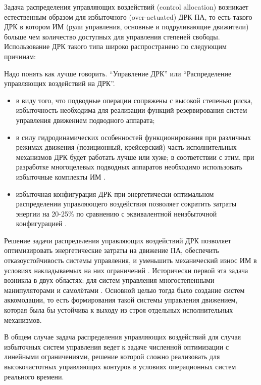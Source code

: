 {\actuality}
Задача распределения управляющих воздействий (control allocation) возникает естественным образом для избыточного (over-actuated) ДРК ПА, то есть такого ДРК в котором ИМ (рули управления, основные и подруливающие движители) больше чем количество доступных для управления степеней свободы. Использование ДРК такого типа широко распространено по следующим причинам:

\begin{notequestion}
    Надо понять как лучше говорить. ``Управление ДРК'' или ``Распределение управляющих воздействий на ДРК''.
\end{notequestion}

\begin{itemize}
    \item в виду того, что подводные операции сопряжены с высокой степенью риска, избыточность необходима для реализации функций резервирования систем управления движением подводного аппарата;
    \item в силу гидродинамических особенностей функционирования при различных режимах движения (позиционный, крейсерский) часть исполнительных механизмов ДРК будет работать лучше или хуже; в соответствии с этим, при разработке многоцелевых подводных аппаратов необходимо использовать избыточные комплекты ИМ \cite{valasek2002design}.
    \item избыточная конфигурация ДРК при энергетически оптимальном распределении управляющего воздействия позволяет сократить затраты энергии на 20-25\% по сравнению с эквивалентной неизбыточной конфигурацией \cite{бриллиантов2005разработка}.
\end{itemize}

Решение задачи распределения управляющих воздействий ДРК позволяет оптимизировать энергетические затраты на движение ПА, обеспечить отказоустойчивость системы управления, и уменьшить механический износ ИМ в условиях накладываемых на них ограничений \cite{enns1998control}.
Исторически первой эта задача возникла в двух областях: для систем управления многостепенными манипуляторами \cite{craig2009introduction} и самолётами \cite{bordignon1996constrained}. 
Основной целью тогда было создание систем аккомодации, то есть формирования такой системы управления движением, которая была бы устойчива к выходу из строя отдельных исполнительных механизмов.

В общем случае задача распределения управляющих воздействий для случая избыточных систем управления ведет к задаче численной оптимизации с линейными ограничениями, решение которой сложно реализовать для высокочастотных управляющих контуров в условиях операционных систем реального времени.

